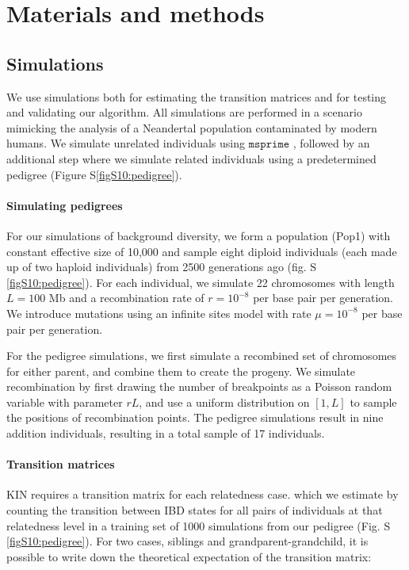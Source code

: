 \documentclass[12pt, letterpaper]{article}
\begin{document}
\section{Materials and methods}\label{method}

\subsection{Simulations}\label{simulat}
We use simulations both for estimating the transition matrices and for testing and validating our algorithm. All simulations are performed in a scenario mimicking the analysis of a Neandertal population contaminated by modern humans. We simulate unrelated individuals using $\texttt{msprime}$ \cite{kelleher_efficient_2016}, followed by an additional step where we simulate related individuals using a predetermined pedigree (Figure S\ref{figS10:pedigree}).

\paragraph{Simulating pedigrees}

For our simulations of background diversity, we form a population (Pop1) with constant effective size of 10,000 and sample eight diploid individuals (each made up of two haploid individuals) from 2500 generations ago (fig. S \ref{figS10:pedigree}). For each individual, we simulate 22 chromosomes with length $L=100$ Mb and a recombination rate of $r=10^{-8}$ per base pair per generation. We introduce mutations using an infinite sites model with rate  $\mu= 10^{-8}$ per base pair per generation. 

For the pedigree simulations, we first simulate a recombined set of chromosomes for either parent, and combine them to create the progeny. We simulate recombination by first drawing the number of breakpoints as a  Poisson random variable with parameter $rL$, and use a uniform distribution on $[1, L]$ to sample the positions of recombination points. The pedigree simulations result in nine addition individuals, resulting in a total sample of 17 individuals.

\paragraph{Transition matrices}
KIN requires a transition matrix for each relatedness case. which we estimate  by counting the transition between IBD states for all pairs of individuals at that relatedness level in a training set of 1000 simulations from our pedigree (Fig. S \ref{figS10:pedigree}). For two cases, siblings and grandparent-grandchild, it is possible to write down the theoretical expectation of the transition matrix: 
\end{document}
